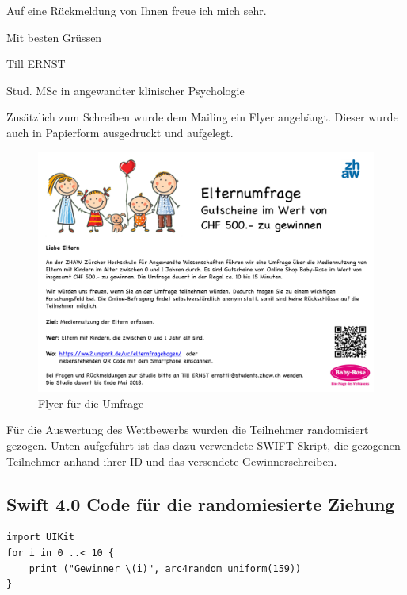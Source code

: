 \begin{flushleft}
\vspace{2mm}
Auf eine Rückmeldung von Ihnen freue ich mich sehr.

\vspace{2mm}
Mit besten Grüssen 

Till ERNST

Stud. MSc in angewandter klinischer Psychologie

\end{flushleft}

Zusätzlich zum Schreiben wurde dem Mailing ein Flyer angehängt. Dieser wurde auch in Papierform ausgedruckt und aufgelegt.


\begin{figure}[h]
  \centering
     \includegraphics[scale=0.9,angle=90]{content/Grafik/Flyer_Umfrage_v2.pdf}
  \caption{Flyer für die Umfrage}
  \label{fig:flyer}
\end{figure}

\newpage

Für die Auswertung des Wettbewerbs wurden die Teilnehmer randomisiert gezogen. Unten aufgeführt ist das dazu verwendete SWIFT-Skript, die gezogenen Teilnehmer anhand ihrer ID und das versendete Gewinnerschreiben.

\subsection*{Swift 4.0 Code für die randomiesierte Ziehung}

\begin{lstlisting}
import UIKit
for i in 0 ..< 10 {
    print ("Gewinner \(i)", arc4random_uniform(159))
}
\end{lstlisting}

